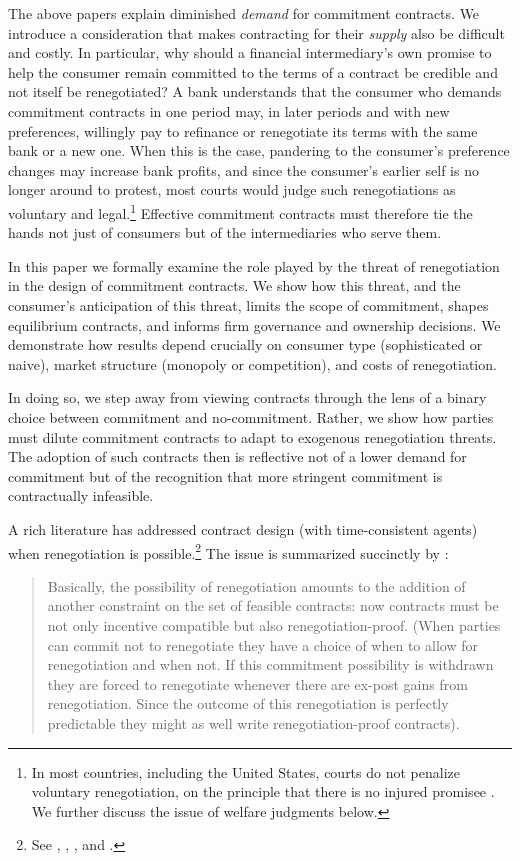\documentclass[11pt,english]{article}
\theoremstyle{plain}
\theoremstyle{definition}
\begin{document}
The above papers explain diminished \emph{demand} for commitment contracts. We introduce a consideration that makes contracting for their \textit{supply} also be difficult and costly. In particular, why should a financial intermediary's own promise to help the consumer remain committed to the terms of a contract be credible and not itself be renegotiated? A bank understands that the consumer who demands commitment contracts in one period may, in later periods and with new preferences, willingly pay to refinance or renegotiate its terms \textendash{} with the same bank or a new one. When this is the case, pandering to the consumer's preference changes may increase bank profits, and since the consumer's earlier self is no longer around to protest, most courts would judge such renegotiations as voluntary and legal.\footnote{In most countries, including the United States, courts do not penalize voluntary renegotiation, on the principle that there is no injured promisee \citep[see discussion in][p448]{laibson1997}. We further discuss the issue of welfare judgments below.} Effective commitment contracts must therefore tie the hands not just of consumers but of the intermediaries who serve them.

In this paper we formally examine the role played by the threat of renegotiation in the design of commitment contracts. We show how this threat, and the consumer's anticipation of this threat, limits the scope of commitment, shapes equilibrium contracts, and informs firm governance and ownership decisions. We demonstrate how results depend crucially on consumer type (sophisticated or naive), market structure (monopoly or competition), and costs of renegotiation.

In doing so, we step away from viewing contracts through the lens of a binary choice between commitment and no-commitment. Rather, we show how parties must dilute commitment contracts to adapt to exogenous renegotiation threats. The adoption of such contracts then is reflective not of a lower demand for commitment but of the recognition that more stringent commitment is contractually infeasible.

A rich literature has addressed contract design (with time-consistent agents) when renegotiation is possible.\footnote{See \citet{hart1988}, \citet{dewatripont1989}, \citet{bolton1990}, and \citet{rubinstein1992}.} The issue is  summarized succinctly by \citet[p303]{bolton1990}:
\begin{quote}
Basically, the possibility of renegotiation amounts to the addition of another constraint on the set of feasible contracts: now contracts must be not only incentive compatible but also renegotiation-proof. (When parties can commit not to renegotiate they have a choice of when to allow for renegotiation and when not. If this commitment possibility is withdrawn they are forced to renegotiate whenever there are ex-post gains from renegotiation. Since the outcome of this renegotiation is perfectly predictable they might as well write renegotiation-proof
contracts).
\end{quote}
\end{document}
